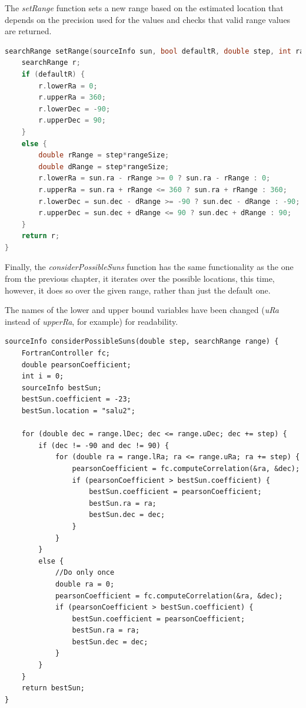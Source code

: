 The \textit{setRange} function sets a new range based on the estimated location that depends on the precision used for the values and checks that valid range values are returned.

\begin{minipage}{\linewidth}
	\begin{lstlisting}[language=c, caption=Setting the new range based on the estimated source location]
searchRange setRange(sourceInfo sun, bool defaultR, double step, int rangeSize) {
	searchRange r;
	if (defaultR) {
		r.lowerRa = 0;
		r.upperRa = 360;
		r.lowerDec = -90;
		r.upperDec = 90;
	}
	else {
		double rRange = step*rangeSize;
		double dRange = step*rangeSize;
		r.lowerRa = sun.ra - rRange >= 0 ? sun.ra - rRange : 0;
		r.upperRa = sun.ra + rRange <= 360 ? sun.ra + rRange : 360;
		r.lowerDec = sun.dec - dRange >= -90 ? sun.dec - dRange : -90;
		r.upperDec = sun.dec + dRange <= 90 ? sun.dec + dRange : 90;
	}
	return r;
}\end{lstlisting}
\end{minipage}

Finally, the \textit{considerPossibleSuns} function has the same functionality as the one from the previous chapter, it iterates over the possible locations, this time, however, it does so over the given range, rather than just the default one.

The names of the lower and upper bound variables have been changed (\textit{uRa} instead of \textit{upperRa}, for example) for readability.

\begin{minipage}{\linewidth}
	\begin{lstlisting}[style=myCStyle, caption=Iterating over possible locations within the given range]
sourceInfo considerPossibleSuns(double step, searchRange range) {
	FortranController fc;
	double pearsonCoefficient;
	int i = 0;
	sourceInfo bestSun;
	bestSun.coefficient = -23;
	bestSun.location = "salu2";

	for (double dec = range.lDec; dec <= range.uDec; dec += step) {
		if (dec != -90 and dec != 90) {
			for (double ra = range.lRa; ra <= range.uRa; ra += step) {
				pearsonCoefficient = fc.computeCorrelation(&ra, &dec);
				if (pearsonCoefficient > bestSun.coefficient) {
					bestSun.coefficient = pearsonCoefficient;
					bestSun.ra = ra;
					bestSun.dec = dec;
				}
			}
		}
		else {
			//Do only once
			double ra = 0;
			pearsonCoefficient = fc.computeCorrelation(&ra, &dec);
			if (pearsonCoefficient > bestSun.coefficient) {
				bestSun.coefficient = pearsonCoefficient;
				bestSun.ra = ra;
				bestSun.dec = dec;
			}
		}
	}
	return bestSun;
}\end{lstlisting}
\end{minipage}

